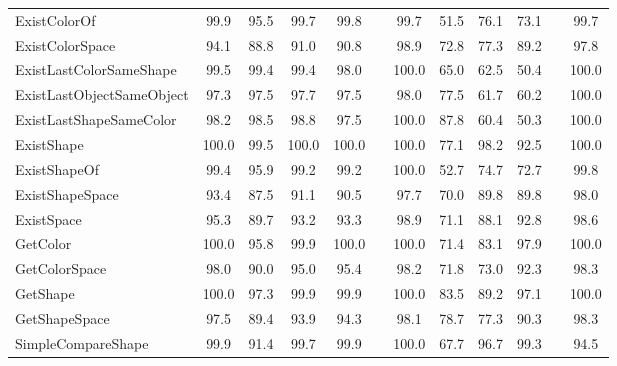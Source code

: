 \begin{table*}[htb]
\begin{adjustbox}{width=\columnwidth}
\begin{tabular}{l c c c c c c c c c c c}
			ExistColorOf    &    99.9    &    95.5    &    99.7    &    99.8    &    &    99.7    &    51.5    &    76.1    &    73.1    &   &    99.7    \\
			ExistColorSpace    &    94.1    &    88.8    &    91.0    &    90.8    &    &    98.9    &    72.8    &    77.3    &    89.2    &   &    97.8    \\
			ExistLastColorSameShape    &    99.5    &    99.4    &    99.4    &    98.0    &    &    100.0    &    65.0    &    62.5    &    50.4    &   &    100.0    \\
			ExistLastObjectSameObject    &    97.3    &    97.5    &    97.7    &    97.5    &    &    98.0    &    77.5    &    61.7    &    60.2    &   &    100.0    \\
			ExistLastShapeSameColor    &    98.2    &    98.5    &    98.8    &    97.5    &    &    100.0    &    87.8    &    60.4    &    50.3    &   &    100.0    \\
			ExistShape    &    100.0    &    99.5    &    100.0    &    100.0    &    &    100.0    &    77.1    &    98.2    &    92.5    &   &    100.0    \\
			ExistShapeOf    &    99.4    &    95.9    &    99.2    &    99.2    &    &    100.0    &    52.7    &    74.7    &    72.7    &   &    99.8    \\
			ExistShapeSpace    &    93.4    &    87.5    &    91.1    &    90.5    &    &    97.7    &    70.0    &    89.8    &    89.8    &   &    98.0    \\
			ExistSpace    &    95.3    &    89.7    &    93.2    &    93.3    &    &    98.9    &    71.1    &    88.1    &    92.8    &   &    98.6    \\
			GetColor    &    100.0    &    95.8    &    99.9    &    100.0    &    &    100.0    &    71.4    &    83.1    &    97.9    &   &    100.0    \\
			GetColorSpace    &    98.0    &    90.0    &    95.0    &    95.4    &    &    98.2    &    71.8    &    73.0    &    92.3    &   &    98.3    \\
			GetShape    &    100.0    &    97.3    &    99.9    &    99.9    &    &    100.0    &    83.5    &    89.2    &    97.1    &   &    100.0    \\
			GetShapeSpace    &    97.5    &    89.4    &    93.9    &    94.3    &    &    98.1    &    78.7    &    77.3    &    90.3    &   &    98.3    \\
			SimpleCompareShape    &    99.9    &    91.4    &    99.7    &    99.9    &    &    100.0    &    67.7    &    96.7    &    99.3    &   &    94.5    \\

\end{tabular}
\end{adjustbox}
\end{table*}
